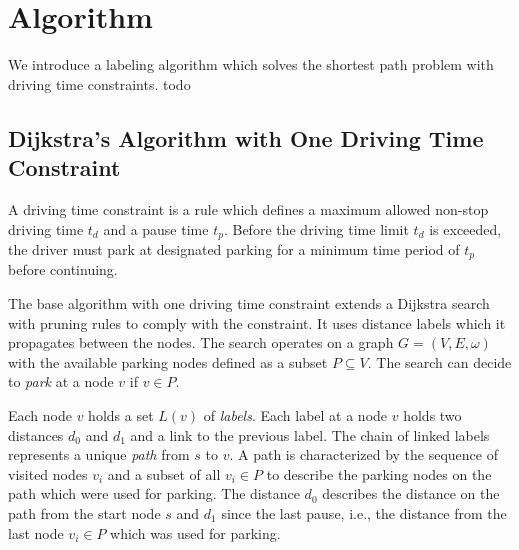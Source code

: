 
\chapter{Algorithm}
\label{ch:Algorithm}
We introduce a labeling algorithm which solves the shortest path problem with driving time constraints. todo

\section{Dijkstra's Algorithm with One Driving Time Constraint}
A driving time constraint is a rule which defines a maximum allowed  non-stop driving time $t_d$ and a pause time $t_p$. Before the driving time limit $t_d$ is exceeded, the driver must park at designated parking for a minimum time period of $t_p$ before continuing.

The base algorithm with one driving time constraint extends a Dijkstra search with pruning rules to comply with the constraint. It uses distance labels which it propagates between the nodes. The search operates on a graph $G = (V,E,\omega)$ with the available parking nodes defined as a subset $P \subseteq V$. The search can decide to \emph{park} at a node $v$ if $v \in P$.

Each node $v$ holds a set $L(v)$ of \emph{labels}. Each label at a node $v$ holds two distances $d_0$ and $d_1$ and a link to the previous label. The chain of linked labels represents a unique \emph{path} from $s$ to $v$. A path is characterized by the sequence of visited nodes $v_i$ and a subset of all $v_i \in P$ to describe the parking nodes on the path which were used for parking. The distance $d_0$ describes the distance on the path from the start node $s$ and $d_1$ since the last pause, i.e., the distance from the last node $v_i \in P$ which was used for parking.


